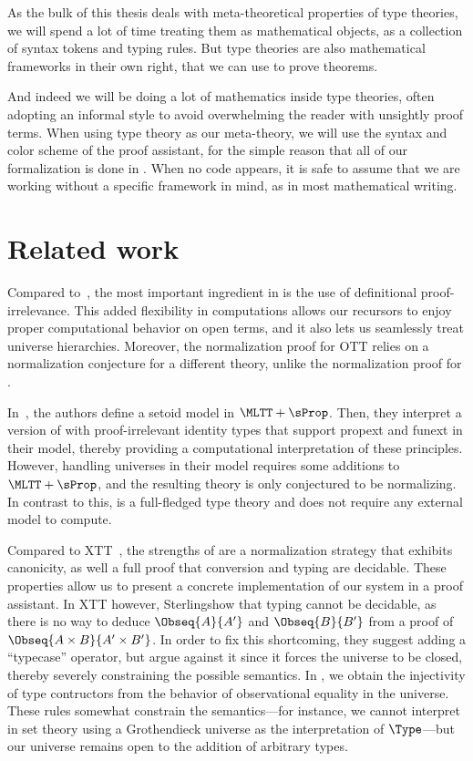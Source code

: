 As the bulk of this thesis deals with meta-theoretical properties of
type theories, we will spend a lot of time treating them as mathematical 
objects, \ie as a collection of syntax tokens and typing rules.
% 
But type theories are also mathematical frameworks in their own right, that
we can use to prove theorems. 

And indeed we will be doing a lot of mathematics inside type theories, often
adopting an informal style to avoid overwhelming the reader with unsightly
proof terms.
% 
When using type theory as our meta-theory, we will use the syntax and color 
scheme of the \Agda proof assistant, for the simple reason that all of our
formalization is done in \Agda.
% 
When no \Agda code appears, it is safe to assume that we are working without
a specific framework in mind, as in most mathematical writing.


\section{Related work}

Compared to~, the most important ingredient in \SetoidTT is the
use of definitional proof-irrelevance.
%
This added flexibility in computations allows our recursors to enjoy proper computational
behavior on open terms, and it also lets us seamlessly treat universe hierarchies.
%
Moreover, the normalization proof for OTT relies on a normalization conjecture for a different
theory, unlike the normalization proof for \SetoidTT.

In~, the authors define a setoid model in \( \MLTT+\sProp \). Then, they
interpret a version of \MLTT with proof-irrelevant identity types that support propext and
funext in their model, thereby providing a computational interpretation of these principles.
%
However, handling universes in their model requires some additions to \( \MLTT+\sProp \), and
the resulting theory is only conjectured to be normalizing.
%
In contrast to this, \SetoidTT is a full-fledged type theory and does not require any external
model to compute.

Compared to XTT~, the strengths of \SetoidTT are a
normalization strategy that exhibits canonicity, as well a full proof that conversion and typing
are decidable. These properties allow us to present a concrete implementation of our system
in a proof assistant.
%
In XTT however, Sterling\etal show that typing cannot be decidable, as there is no way to deduce
\( \Obseq{A}{A'} \) and \( \Obseq{B}{B'} \) from a proof of \( \Obseq{A \times B}{A' \times B'} \).
%
In order to fix this shortcoming, they suggest adding a ``typecase'' operator, but
argue against it since it forces the universe to be closed, thereby severely constraining the
possible semantics.
%
In \SetoidTT, we obtain the injectivity of type contructors from the behavior of observational
equality in the universe. These rules somewhat constrain the semantics---for instance, we cannot
interpret \SetoidTT in set theory using a Grothendieck universe as the interpretation of \( \Type \)---but our universe remains open to the addition of arbitrary types.

